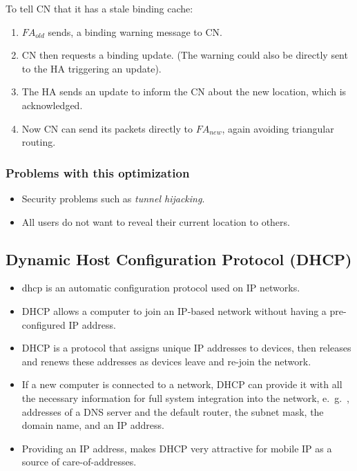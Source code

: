 To tell CN that it has a stale binding cache:
\begin{multicols}{2}
	\begin{enumerate}
		\item $ FA_{old} $ sends, a binding warning message to CN. 
		\item CN then requests a binding update. (The warning could also be directly sent to the HA triggering an update). 
		\item The HA sends an update to inform the CN about the new location, which is acknowledged. 
		\item Now CN can send its packets directly to $ FA_{new} $, again avoiding triangular routing. 
	\end{enumerate}
\end{multicols}
	


\subsubsection*{Problems with this optimization}
\begin{multicols}{2}
\begin{itemize}
	\item Security problems such as \textit{tunnel hijacking}.
	\item All users do not want to reveal their current location to others.
\end{itemize}
\end{multicols}



\subsection[DHCP]{Dynamic Host Configuration Protocol (DHCP)}
\begin{itemize}
	\item \gls{dhcp} is an automatic configuration protocol used on IP networks. 
	\item DHCP allows a computer to join an IP-based network without having a pre-configured IP address. 
	\item DHCP is a protocol that assigns unique IP addresses to devices, then releases and renews these addresses as devices leave and re-join the network.
	\item If a new computer is connected to a network, DHCP can provide it with all the necessary information for full system integration into the network, e.\ g.\ , addresses of a DNS server and the default router, the subnet mask, the domain name, and an IP address. 
	\item Providing an IP address, makes DHCP very attractive for mobile IP as a source of care-of-addresses.
\end{itemize}

